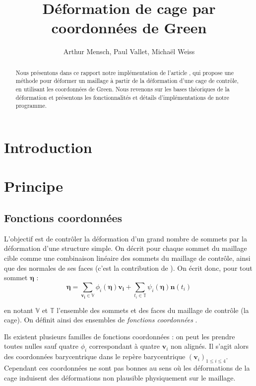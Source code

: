 \documentclass[10pt,a4paper]{article}
\author{Arthur Mensch, Paul Vallet, Michaël Weiss}
\title{Déformation de cage par coordonnées de Green}
\begin{document}
\maketitle
\begin{abstract}
Nous présentons dans ce rapport notre implémentation de l'article \cite{lipman2008green}, qui propose une méthode pour déformer un maillage à partir de la déformation d'une cage de contrôle, en utilisant les coordonnées de Green. Nous revenons sur les bases théoriques de la déformation et présentons les fonctionnalités et détails d'implémentations de notre programme.
\end{abstract}
\section*{Introduction}

\section{Principe}

\subsection{Fonctions coordonnées}
L'objectif est de contrôler la déformation d'un grand nombre de sommets par la déformation d'une structure simple. On décrit pour chaque sommet du maillage cible comme une combinaison linéaire des sommets du maillage de contrôle, ainsi que des normales de ses faces (c'est la contribution de \cite{lipman2008green}). On écrit donc, pour tout sommet $\mathbf{\eta}$ :
\begin{equation}
\label{eq:linear}
\mathbf{\eta} = \sum_{\mathbf{v_i} \in \mathbb{V}} \phi_i \left( \mathbf{\eta} \right) \mathbf{v_i} 
+ \sum_{t_i \in \mathbb{T}} \psi_i \left( \mathbf{\eta} \right) \mathbf{n} \left( t_i \right)
\end{equation}

en notant $\mathbb{V}$ et $\mathbb{T}$ l'ensemble des sommets et des faces du maillage de contrôle (la cage). On définit ainsi des ensembles de \textit{fonctions coordonnées} .

Ils existent plusieurs familles de fonctions coordonnées : on peut les prendre toutes nulles sauf quatre $\phi_i$ correspondant à quatre $\mathbf{v}_i$ non alignés. Il s'agit alors des coordonnées barycentrique dans le repère barycentrique $\left( \mathbf{v}_i \right)_{1 \leq i \leq 4}$. Cependant ces coordonnées ne sont pas bonnes au sens où les déformations de la cage induisent des déformations non plausible physiquement sur le maillage.
\end{document}
